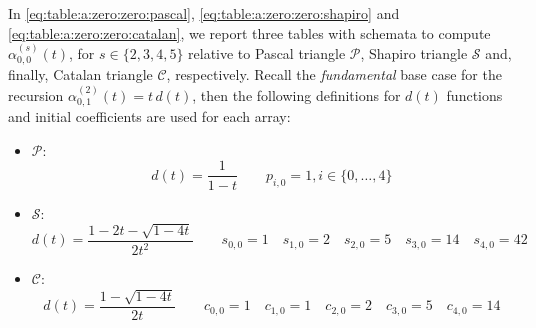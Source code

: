 In \autoref{eq:table:a:zero:zero:pascal}, \autoref{eq:table:a:zero:zero:shapiro} and
\autoref{eq:table:a:zero:zero:catalan}, we report three tables with schemata to compute
$\alpha_{0,0}^{(s)}(t)$, for $s\in\lbrace 2, 3, 4, 5\rbrace$ relative to 
Pascal triangle $\mathcal{P}$, Shapiro triangle $\mathcal{S}$ and, finally,
Catalan triangle $\mathcal{C}$, respectively. Recall the \emph{fundamental}
base case for the recursion $\alpha_{0,1}^{(2)}(t) = t\,d(t)$, then the following 
definitions for $d(t)$ functions and initial coefficients are used for each array: 
\begin{itemize}
\item $\mathcal{P}$:
\begin{displaymath}
     d(t) = \frac{1}{1-t} \quad \quad p_{i,0}=1, i\in\lbrace 0,\ldots,4\rbrace
\end{displaymath}

\item $\mathcal{S}$:
\begin{displaymath}
        d(t) = \frac{1-2t-\sqrt{1-4t}}{2t^{2}} \quad \quad 
            s_{0,0}=1\quad s_{1,0}=2\quad s_{2,0}=5\quad s_{3,0}=14\quad s_{4,0}=42
\end{displaymath}

\item $\mathcal{C}$:
\begin{displaymath}
        d(t) = \frac{1-\sqrt{1-4t}}{2t} \quad \quad 
            c_{0,0}=1\quad c_{1,0}=1\quad c_{2,0}=2\quad c_{3,0}=5\quad c_{4,0}=14
\end{displaymath}

\end{itemize}

